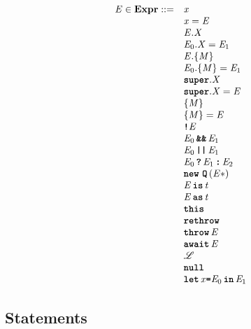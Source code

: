 \documentclass[a4paper,oneside,fleqn]{article}
\newcommand{\synt}[1]{\ensuremath{\text{\textbf{\texttt{#1}}}}}
\newcommand{\this}{\synt{this}}
\newcommand{\Rethrow}{\synt{rethrow}}
\newcommand{\Throw}[1]{\synt{throw}\,#1}
\newcommand{\dexpr}{\mathbf{Expr}}
\newcommand{\idmeta}{\ensuremath{\mathit{X}}}
\newcommand{\typemeta}{\ensuremath{\mathit{t}}}
\begin{document}
\[
\begin{array}{rl}
  \expressionmeta \in \dexpr ::=
  & \VariableGet{\variablemeta} \\
  & \VariableSet{\variablemeta}{\expressionmeta} \\
  & \PropertyGet{\expressionmeta}{\idmeta} \\
  & \PropertySet{\expressionmeta_0}{\idmeta}{\expressionmeta_1} \\
  & \DirectPropertyGet{\expressionmeta}{\membermeta} \\
  & \DirectPropertySet{\expressionmeta_0}{\membermeta}{\expressionmeta_1} \\
  & \SuperPropertyGet{\idmeta} \\
  & \SuperPropertySet{\idmeta}{\expressionmeta} \\
  & \StaticGet{\membermeta} \\
  & \StaticSet{\membermeta}{\expressionmeta} \\
  & \Not{\expressionmeta} \\
  & \AndExpression{\expressionmeta_0}{\expressionmeta_1} \\
  & \OrExpression{\expressionmeta_0}{\expressionmeta_1} \\
  & \ConditionalExpression{\expressionmeta_0}{\expressionmeta_1}{\expressionmeta_2} \\
  & \New{\synt{Q}}{\expressionmeta*} \\
  & \IsExpression{\expressionmeta}{\typemeta} \\
  & \AsExpression{\expressionmeta}{\typemeta} \\
  & \this \\
  & \Rethrow \\
  & \Throw{\expressionmeta} \\
  & \AwaitExpression{\expressionmeta} \\
  & \lit \\
  & \NullLiteral \\
  & \Let{\variablemeta}{\expressionmeta_0}{\expressionmeta_1} \\
\end{array}
\]


\subsection{Statements}
\label{subsec:stmt-syntax}

\newcommand{\ExpressionStatement}[1]{\{\, #1\, \}}
\newcommand{\Block}[1]{#1\synt{;} \mlist{\statementmeta}}
\newcommand{\EmptyStatement}{\{\}}
\end{document}
